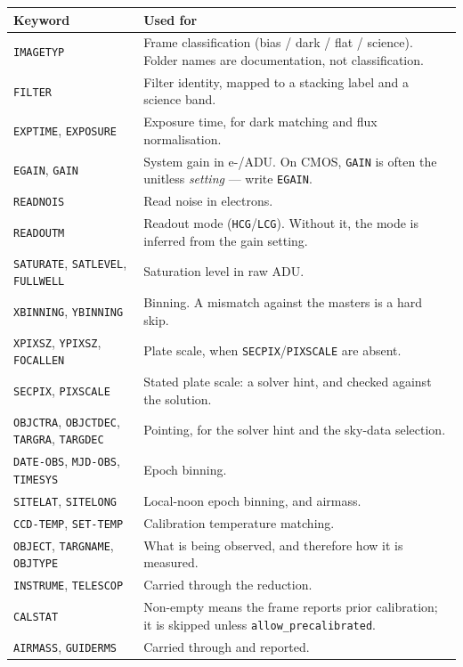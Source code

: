 \documentclass[11pt,a4paper]{article}
\begin{document}
\begin{center}
\begin{longtable}{|p{4.4cm}|p{10.1cm}|}
\hline
\textbf{Keyword} & \textbf{Used for} \\
\hline
\endhead
\texttt{IMAGETYP} & Frame classification (bias / dark / flat / science). Folder names are documentation, not classification. \\
\hline
\texttt{FILTER} & Filter identity, mapped to a stacking label and a science band. \\
\hline
\texttt{EXPTIME}, \texttt{EXPOSURE} & Exposure time, for dark matching and flux normalisation. \\
\hline
\texttt{EGAIN}, \texttt{GAIN} & System gain in e-/ADU. On CMOS, \texttt{GAIN} is often the unitless \emph{setting} --- write \texttt{EGAIN}. \\
\hline
\texttt{READNOIS} & Read noise in electrons. \\
\hline
\texttt{READOUTM} & Readout mode (\texttt{HCG}/\texttt{LCG}). Without it, the mode is inferred from the gain setting. \\
\hline
\texttt{SATURATE}, \texttt{SATLEVEL}, \texttt{FULLWELL} & Saturation level in raw ADU. \\
\hline
\texttt{XBINNING}, \texttt{YBINNING} & Binning. A mismatch against the masters is a hard skip. \\
\hline
\texttt{XPIXSZ}, \texttt{YPIXSZ}, \texttt{FOCALLEN} & Plate scale, when \texttt{SECPIX}/\texttt{PIXSCALE} are absent. \\
\hline
\texttt{SECPIX}, \texttt{PIXSCALE} & Stated plate scale: a solver hint, and checked against the solution. \\
\hline
\texttt{OBJCTRA}, \texttt{OBJCTDEC}, \texttt{TARGRA}, \texttt{TARGDEC} & Pointing, for the solver hint and the sky-data selection. \\
\hline
\texttt{DATE-OBS}, \texttt{MJD-OBS}, \texttt{TIMESYS} & Epoch binning. \\
\hline
\texttt{SITELAT}, \texttt{SITELONG} & Local-noon epoch binning, and airmass. \\
\hline
\texttt{CCD-TEMP}, \texttt{SET-TEMP} & Calibration temperature matching. \\
\hline
\texttt{OBJECT}, \texttt{TARGNAME}, \texttt{OBJTYPE} & What is being observed, and therefore how it is measured. \\
\hline
\texttt{INSTRUME}, \texttt{TELESCOP} & Carried through the reduction. \\
\hline
\texttt{CALSTAT} & Non-empty means the frame reports prior calibration; it is skipped unless \texttt{allow\_precalibrated}. \\
\hline
\texttt{AIRMASS}, \texttt{GUIDERMS} & Carried through and reported. \\
\hline
\end{longtable}
\end{center}
\end{document}
